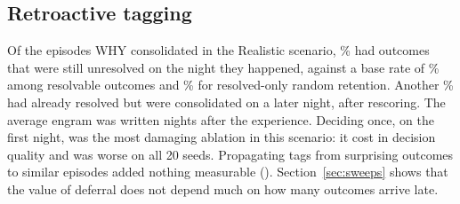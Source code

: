 \subsection{Retroactive tagging}
Of the episodes WHY consolidated in the Realistic scenario, \% had outcomes that were still unresolved on the night they happened, against a base rate of \% among resolvable outcomes and \% for resolved-only random retention. Another \% had already resolved but were consolidated on a later night, after rescoring. The average engram was written  nights after the experience. Deciding once, on the first night, was the most damaging ablation in this scenario: it cost  in decision quality and was worse on all 20 seeds. Propagating tags from surprising outcomes to similar episodes added nothing measurable (). Section~\ref{sec:sweeps} shows that the value of deferral does not depend much on how many outcomes arrive late.
